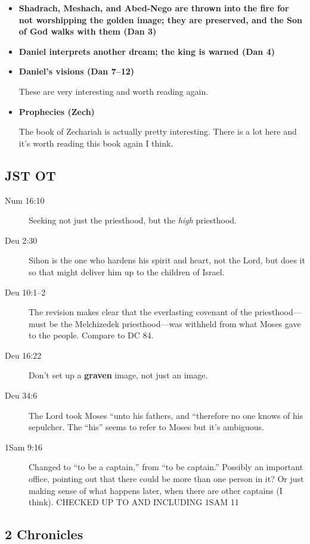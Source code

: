 \begin{itemize}
\item \textbf{Shadrach, Meshach, and Abed-Nego are thrown into the fire for not worshipping the golden image; they are preserved, and the Son of God walks with them (Dan 3)}

\item \textbf{Daniel interprets another dream; the king is warned (Dan 4)}

\item \textbf{Daniel's visions (Dan 7--12)}

	These are very interesting and worth reading again.
	
\item \textbf{Prophecies (Zech)}

	The book of Zechariah is actually pretty interesting. There is a lot here and it's worth reading this book again I think.
	
\end{itemize}

\subsection{JST OT} %

	\begin{description}
	\item[Num 16:10] Seeking not just the priesthood, but the \textit{high} priesthood.
	\item[Deu 2:30] Sihon is the one who hardens his spirit and heart, not the Lord, but does it so that might deliver him up to the children of Israel.
	\item[Deu 10:1--2] The revision makes clear that the everlasting covenant of the priesthood---must be the Melchizedek priesthood---was withheld from what Moses gave to the people. Compare to DC 84.
	\item[Deu 16:22] Don't set up a \textbf{graven} image, not just an image.
	\item[Deu 34:6] The Lord took Moses ``unto his fathers, and ``therefore no one knows of his sepulcher. The ``his'' seems to refer to Moses but it's ambiguous.
	\item[1Sam 9:16] Changed to ``to be a captain,'' from ``to be captain.'' Possibly an important office, pointing out that there could be more than one person in it? Or just making sense of what happens later, when there are other captains (I think).
	CHECKED UP TO AND INCLUDING 1SAM 11
	\end{description}
	
\subsection{2 Chronicles} %

